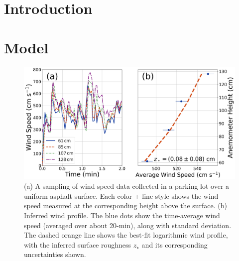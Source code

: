\documentclass[linenumbers]{aastex631}
\begin{document}
\section{Introduction} \label{sec:Introduction}


\section{Model}



\begin{figure}
    \centering
    \includegraphics[width=\textwidth]{figures and data/Alamosa_Parking_Lot_Windspeeds.jpg}
    \caption{(a) A sampling of wind speed data collected in a parking lot over a uniform asphalt surface. Each color + line style shows the wind speed measured at the corresponding height above the surface. (b) Inferred wind profile. The blue dots show the time-average wind speed (averaged over about 20-min), along with standard deviation. The dashed orange line shows the best-fit logarithmic wind profile, with the inferred surface roughness $z_\star$ and its corresponding uncertainties shown.}
    \label{fig:Alamosa_Parking_Lot_Windspeeds}
\end{figure}
\end{document}
